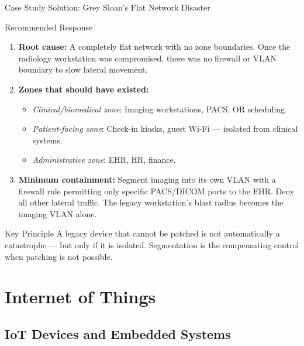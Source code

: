 \documentclass[aspectratio=169]{beamer}  %
\begin{document}
\begin{frame}{Case Study Solution: Grey Sloan's Flat Network Disaster}
    \begin{exampleblock}{Recommended Response}
        \footnotesize
        \begin{enumerate}
            \item \textbf{Root cause:} A completely flat network with no zone boundaries. Once the radiology workstation was compromised, there was no firewall or VLAN boundary to slow lateral movement.
            \item \textbf{Zones that should have existed:}
                \begin{itemize}\setlength{\itemsep}{1pt}
                    \item \emph{Clinical/biomedical zone}: Imaging workstations, PACS, OR scheduling.
                    \item \emph{Patient-facing zone}: Check-in kiosks, guest Wi-Fi --- isolated from clinical systems.
                    \item \emph{Administrative zone}: EHR, HR, finance.
                \end{itemize}
            \item \textbf{Minimum containment:} Segment imaging into its own VLAN with a firewall rule permitting only specific PACS/DICOM ports to the EHR. Deny all other lateral traffic. The legacy workstation's blast radius becomes the imaging VLAN alone.
        \end{enumerate}
    \end{exampleblock}
    \begin{alertblock}{Key Principle}
        \footnotesize
        A legacy device that cannot be patched is not automatically a catastrophe --- but only if it is isolated. Segmentation is the compensating control when patching is not possible.
    \end{alertblock}
\end{frame}

\section{Internet of Things}
\subsection{IoT Devices and Embedded Systems}
\end{document}
